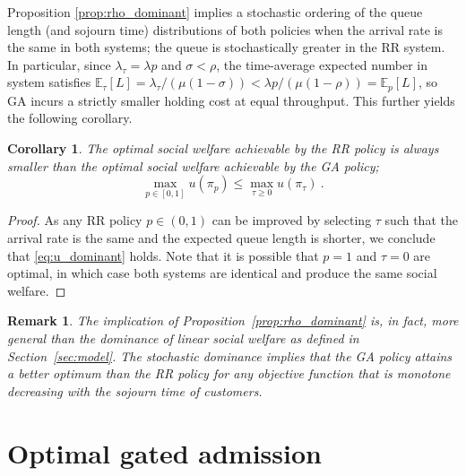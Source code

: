 \documentclass[11pt]{article}
\newtheorem{corollary}[theorem]{Corollary}
\newtheorem{remark}[theorem]{Remark}
\def\E{\mathbb{E}}
\begin{document}

Proposition \ref{prop:rho_dominant} implies a stochastic ordering of the queue length (and sojourn time) distributions of both policies when the arrival rate is the same in both systems; the queue is stochastically greater in the RR system. In particular, since $\lambda_\tau=\lambda p$ and $\sigma<\rho$, the time-average expected number in system satisfies $\E_\tau[L]=\lambda_\tau/(\mu(1-\sigma))<\lambda p/(\mu(1-\rho))=\E_p[L]$, so GA incurs a strictly smaller holding cost at equal throughput. This further yields the following corollary. 
\begin{corollary}\label{corr:u_dominant}
    The optimal social welfare achievable by the RR policy is always smaller than the optimal social welfare achievable by the GA policy;
\begin{equation}\label{eq:u_dominant}
    \max_{p\in[0,1]} u(\pi_p) \leq \max_{\tau\geq 0}u(\pi_\tau)\ .
\end{equation}
\end{corollary}
\begin{proof}
    As any RR policy $p\in(0,1)$ can be improved by selecting $\tau$ such that the arrival rate is the same and the expected queue length is shorter, we conclude that \eqref{eq:u_dominant} holds.  Note that it is possible that $p=1$ and $\tau=0$ are optimal, in which case both systems are identical and produce the same social welfare.
\end{proof}

\begin{remark}\label{rem:general_bound}
    The implication of Proposition~\ref{prop:rho_dominant} is, in fact, more general than the dominance of linear social welfare as defined in Section~\ref{sec:model}. The stochastic dominance implies that the GA policy attains a better optimum than the RR policy for any objective function that is monotone decreasing with the sojourn time of customers.
\end{remark}

\section{Optimal gated admission}\label{sec:opt_GA}
\end{document}
